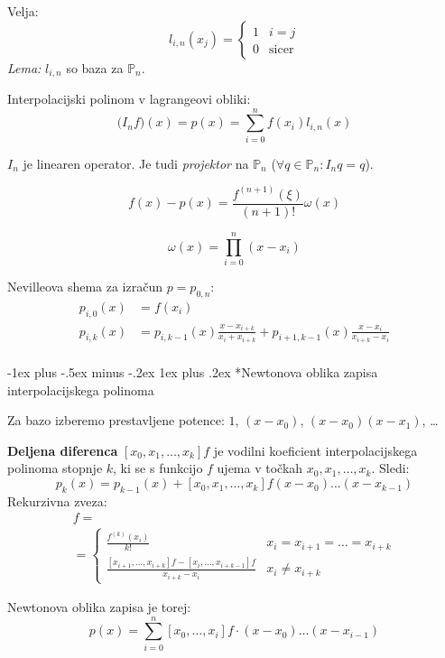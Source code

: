\documentclass[a3paper,8pt]{extarticle}
\makeatletter
\renewcommand{\subsubsection}{\@startsection{subsubsection}{3}{0mm}%
                                {-1ex plus -.5ex minus -.2ex}%
                                {1ex plus .2ex}%
                                {\normalfont\small\bfseries}}
\makeatother
\begin{document}
\begin{multicols}{5}
Velja:
\[ 
l_{i,n}(x_j) = 
\begin{cases}
    1 & i = j \\
    0 & \text{sicer}
\end{cases}
\]
\textit{Lema:} $l_{i, n}$ so baza za $\mathbb{P}_n$.


Interpolacijski polinom v lagrangeovi obliki:
\[ \big( I_n f \big)(x) = p(x) = \sum_{i=0}^n f(x_i) l_{i,n}(x)\]

$I_n$ je linearen operator. Je tudi \textit{projektor} na $\mathbb{P}_n$ ($\forall q \in \mathbb{P}_n : I_n q = q$).

\[ f(x) - p(x) = \frac{f^{(n+1)}(\xi)}{(n+1)!} \omega(x) \]

\[ \omega(x) = \prod_{i=0}^n (x-x_i)\]

Nevilleova shema za izračun $p = p_{0,n}$:
\begin{align*}
	p_{i, 0}(x) &= f(x_i) \\
	p_{i, k}(x) &= p_{i, k-1}(x) \frac{x-x_{i+k}}{x_i + x_{i+k}} + p_{i+1, k-1}(x) \frac{x-x_i}{x_{i+k} - x_i} \\
\end{align*}

\subsubsection*{Newtonova oblika zapisa interpolacijskega polinoma}

Za bazo izberemo prestavljene potence: $1$, $(x-x_0)$, $(x-x_0)(x-x_1)$, \dots  


\textbf{Deljena diferenca} $[x_0, x_1, \dots, x_k] f$ je vodilni koeficient interpolacijskega polinoma
stopnje $k$, ki se s funkcijo $f$ ujema v točkah $x_0, x_1, \dots, x_k$. Sledi:
\[ p_k(x) = p_{k-1}(x) + [x_0, x_1, \dots, x_k] f (x-x_0)\dots (x-x_{k-1})\]
Rekurzivna zveza:
\begin{multline*}
    [x_i, x_{i+1}, \dots, x_{i+k}]f = \\
    = \begin{cases}
        \frac{f^{(k)}(x_i)}{k!} & {\scriptstyle x_i = x_{i+1} = \dots = x_{i+k}} \\
        \frac{[x_{i+1}, \dots, x_{i+k}]f- [x_i, \dots, x_{i+k-1}]f}{x_{i+k}-x_i} & {\scriptstyle x_i \neq x_{i+k} }
    \end{cases} 
\end{multline*} 

Newtonova oblika zapisa je torej:
\[ p(x) = \sum_{i=0}^n [x_0, \dots, x_i]f \cdot (x-x_0)\dots (x-x_{i-1}) \]


\end{multicols}
\end{document}

